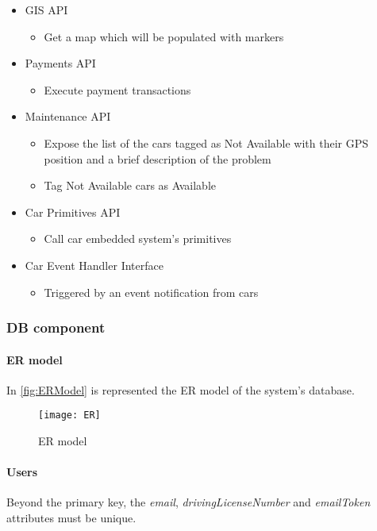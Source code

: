 \begin{itemize}
	\item GIS API
	\begin{itemize}
		\item Get a map which will be populated with markers
	\end{itemize}
	
	\item Payments API
	\begin{itemize}
		\item Execute payment transactions
	\end{itemize}
	
	\item Maintenance API
	\begin{itemize}
		\item Expose the list of the cars tagged as Not Available with their GPS position and a brief description of the problem
		\item Tag Not Available cars as Available
	\end{itemize}
	
	\item Car Primitives API
	\begin{itemize}
		\item Call car embedded system's primitives
	\end{itemize}
	
	\item Car Event Handler Interface 
	\begin{itemize}
		\item Triggered by an event notification from cars
	\end{itemize}
\end{itemize}
\clearpage

\subsubsection{DB component}
\paragraph{ER model}In \autoref{fig:ERModel} is represented the ER model of the system's database.

\begin{figure}[h!]
	\centering
	\texttt{[image: ER]}
	\caption{
		\label{fig:ERModel} 
		ER model
	}
\end{figure}

\paragraph{Users} Beyond the primary key, the \mbox{\emph{email}}, \mbox{\emph{drivingLicenseNumber}} and \mbox{\emph{emailToken}} attributes must be unique.

